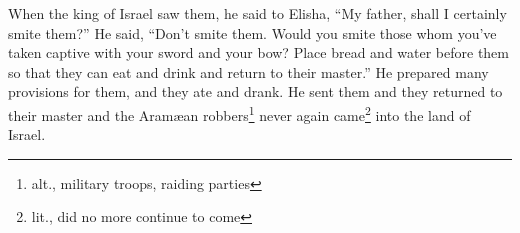 \begin{inparaenum}
     When the king of Israel saw them, he said to Elisha, ``My father, shall I certainly smite them?''%
     He said, ``Don't smite them. Would you smite those whom you've taken captive with your sword and your bow? Place bread and water before them so that they can eat and drink and return to their master.''%
     He prepared many provisions for them, and they ate and drank. He sent them and they returned to their master and the Aram\ae{}an robbers\footnote{alt., military troops, raiding parties} never again came\footnote{lit., did no more continue to come} into the land of Israel.%
    
\end{inparaenum}
